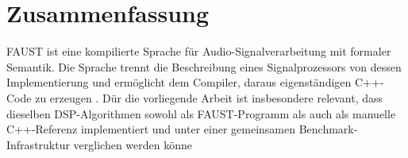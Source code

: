 \section{Zusammenfassung}
FAUST ist eine kompilierte Sprache für Audio-Signalverarbeitung mit formaler Semantik.  Die Sprache trennt die Beschreibung eines Signalprozessors von dessen Implementierung und ermöglicht dem Compiler, daraus eigenständigen C++-Code zu erzeugen \parencite{orlarey:hal-02159014}. Dür die vorliegende Arbeit ist insbesondere relevant, dass dieselben DSP-Algorithmen sowohl als FAUST-Programm als auch als manuelle C++-Referenz implementiert und unter einer gemeinsamen Benchmark-Infrastruktur verglichen werden könne